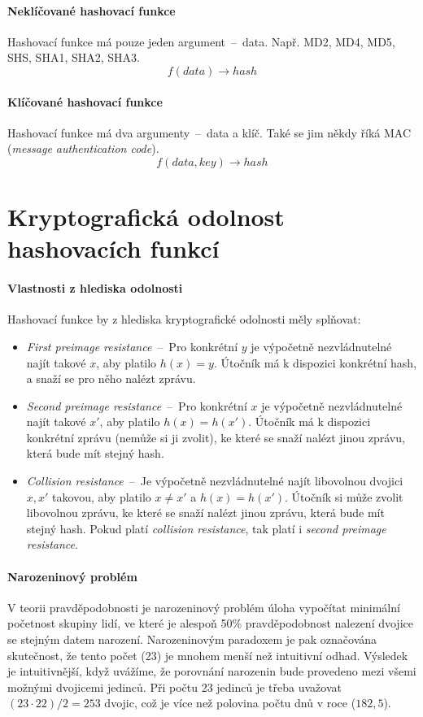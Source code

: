 \paragraph*{Neklíčované hashovací funkce} Hashovací funkce má pouze jeden argument~--~data. Např. MD2, MD4, MD5, SHS, SHA1, SHA2, SHA3. $$f(data) \rightarrow hash$$

\paragraph*{Klíčované hashovací funkce} Hashovací funkce má dva argumenty~--~data a klíč. Také se jim někdy říká MAC (\textit{message authentication code}). $$f(data, key) \rightarrow hash$$


\section{Kryptografická odolnost hashovacích funkcí}

\paragraph*{Vlastnosti z hlediska odolnosti} Hashovací funkce by z hlediska kryptografické odolnosti měly splňovat: \begin{itemize}
    \item \textit{First preimage resistance}~--~Pro konkrétní $y$ je výpočetně nezvládnutelné najít takové $x$, aby platilo $h(x) = y$. Útočník má k dispozici konkrétní hash, a snaží se pro něho nalézt zprávu.
    \item \textit{Second preimage resistance}~--~Pro konkrétní $x$ je výpočetně nezvládnutelné najít takové $x'$, aby platilo $h(x) = h(x')$. Útočník má k dispozici konkrétní zprávu (nemůže si ji zvolit), ke které se snaží nalézt jinou zprávu, která bude mít stejný hash.
    \item \textit{Collision resistance}~--~Je výpočetně nezvládnutelné najít libovolnou dvojici $x, x'$ takovou, aby platilo $x \neq x'$ a $h(x) = h(x')$. Útočník si může zvolit libovolnou zprávu, ke které se snaží nalézt jinou zprávu, která bude mít stejný hash. Pokud platí \textit{collision resistance}, tak platí i \textit{second preimage resistance}.
\end{itemize}

\paragraph*{Narozeninový problém} V teorii pravděpodobnosti je narozeninový problém úloha vypočítat minimální početnost skupiny lidí, ve které je alespoň 50\% pravděpodobnost nalezení dvojice se stejným datem narození. Narozeninovým paradoxem je pak označována skutečnost, že tento počet (23) je mnohem menší než intuitivní odhad.
Výsledek je intuitivnější, když uvážíme, že porovnání narozenin bude provedeno mezi všemi možnými dvojicemi jedinců. Při počtu 23 jedinců je třeba uvažovat $(23 \cdot 22) / 2 = 253$ dvojic, což je více než polovina počtu dnů v roce ($182,5$).

